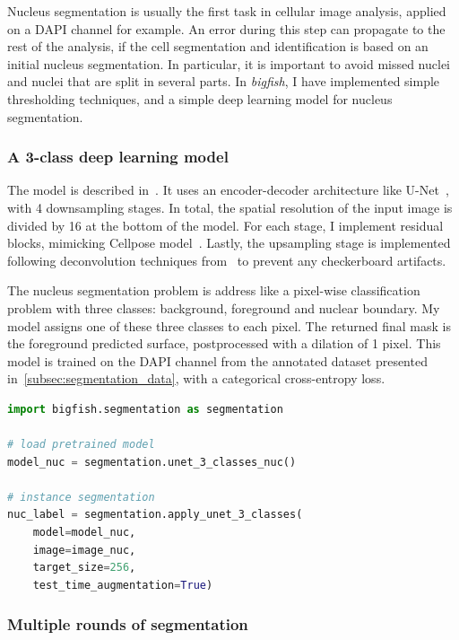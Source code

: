 Nucleus segmentation is usually the first task in cellular image analysis, applied on a DAPI channel for example.
An error during this step can propagate to the rest of the analysis, if the cell segmentation and identification is based on an initial nucleus segmentation.
In particular, it is important to avoid missed nuclei and nuclei that are split in several parts.
In \emph{bigfish}, I have implemented simple thresholding techniques, and a simple deep learning model for nucleus segmentation.

\subsubsection{A 3-class deep learning model}

The model is described in~\cite{Imbert_fq_2022}.
It uses an encoder-decoder architecture like U-Net~\cite{Ronneberger_unet}, with 4 downsampling stages.
In total, the spatial resolution of the input image is divided by 16 at the bottom of the model.
For each stage, I implement residual blocks, mimicking Cellpose model~\cite{stringer_cellpose_2021}.
Lastly, the upsampling stage is implemented following deconvolution techniques from~\cite{odena2016deconvolution} to prevent any checkerboard artifacts.

The nucleus segmentation problem is address like a pixel-wise classification problem with three classes: background, foreground and nuclear boundary.
My model assigns one of these three classes to each pixel.
The returned final mask is the foreground predicted surface, postprocessed with a dilation of 1 pixel.
This model is trained on the DAPI channel from the annotated dataset presented in~\ref{subsec:segmentation_data}, with a categorical cross-entropy loss.\\

\begin{minipage}{0.9\textwidth}
\begin{lstlisting}[language=Python]
import bigfish.segmentation as segmentation

# load pretrained model
model_nuc = segmentation.unet_3_classes_nuc()

# instance segmentation
nuc_label = segmentation.apply_unet_3_classes(
    model=model_nuc,
	image=image_nuc,
	target_size=256,
	test_time_augmentation=True)
\end{lstlisting}
\end{minipage}

\subsubsection{Multiple rounds of segmentation}


